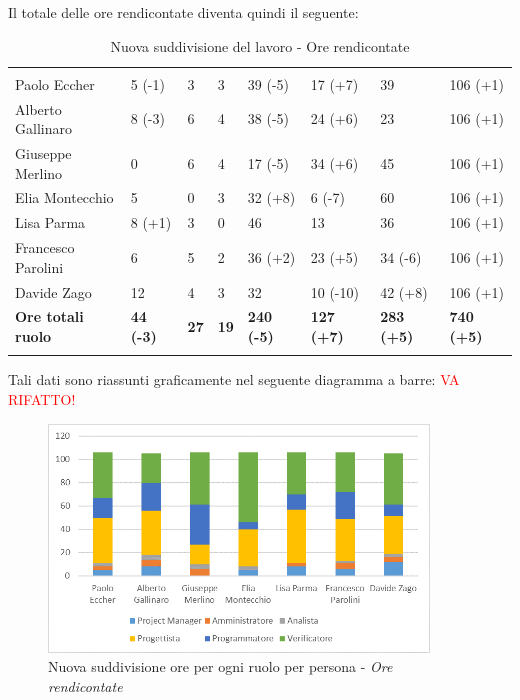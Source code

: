 Il totale delle ore rendicontate diventa quindi il seguente:
			\begin{table}[H]
	\centering
	\begin{tabular}{|C{4cm}|C{0.8cm}|C{0.8cm}|C{0.8cm}|C{0.8cm}|C{0.8cm}|C{0.8cm}|C{3cm}|}
		 & & &&&&&\\
		Paolo Eccher       & 5 (-1) & 3 & 3 & 39 (-5) & 17 (+7) & 39 & 106 (+1) \\
		\hline
		Alberto Gallinaro  & 8 (-3) & 6 & 4 & 38 (-5) & 24 (+6) & 23 & 106 (+1) \\
		\hline
		Giuseppe Merlino   & 0 & 6 & 4 & 17 (-5) & 34 (+6) & 45 & 106 (+1) \\
		\hline
		Elia Montecchio    & 5 & 0 & 3 & 32 (+8) & 6 (-7) & 60 & 106 (+1) \\
		\hline
		Lisa Parma         & 8 (+1) & 3 & 0 & 46 & 13 & 36 & 106 (+1) \\
		\hline
		Francesco Parolini& 6 & 5 & 2 & 36 (+2) & 23 (+5) & 34 (-6) & 106 (+1) \\
		\hline
		Davide Zago        & 12 & 4 & 3 & 32 & 10 (-10) & 42 (+8) & 106 (+1) \\
		\hline
		\textbf{Ore totali ruolo}  & \textbf{44 (-3)} & \textbf{27} & \textbf{19} & \textbf{240 (-5)} & \textbf{127 (+7)} & \textbf{283 (+5)} & \textbf{740 (+5)} \\
	\end{tabular}
	\caption{Nuova suddivisione del lavoro - Ore rendicontate }
\end{table}

Tali dati sono riassunti graficamente nel seguente diagramma a barre:
\textcolor{red}{VA RIFATTO!}
\begin{figure}[H] 
	\centering 
	\includegraphics[width=0.9\textwidth]{images/BarreSoloRendicontatoNuovo.png} 
	\caption{Nuova suddivisione ore per ogni ruolo per persona - \textit{Ore rendicontate}}
	\label{BarreRendicontate}
\end{figure}

